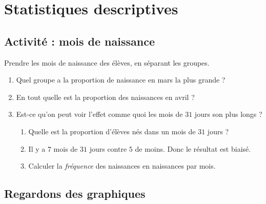 
\chapter{Statistiques descriptives}

\section{Activité : mois de naissance}

Prendre les mois de naissance des élèves, en séparant les groupes.
\begin{enumerate}
    \item
        Quel groupe a la proportion de naissance en mars la plus grande ?
    \item
        En tout quelle est la proportion des naissances en avril ?
    \item 
        Est-ce qu'on peut voir l'effet comme quoi les mois de \( 31\) jours son plus longs ? 
        \begin{enumerate}
            \item
                Quelle est la proportion d'élèves nés dans un mois de \( 31\) jours ?
            \item
                Il y a \( 7\) mois de $31$ jours contre \( 5\) de moins. Donc le résultat est biaisé.
            \item
                Calculer la \emph{fréquence} des naissances en naissances par mois.
        \end{enumerate}
\end{enumerate}

\section{Regardons des graphiques}

